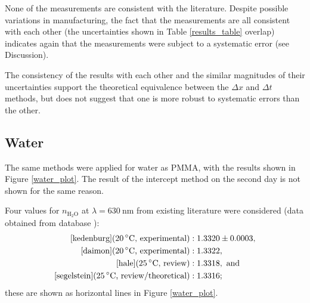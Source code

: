 \documentclass[
    aps,
    prl,
    reprint,
    10pt,
    amsmath,
    amssymb,
    a4paper,
    longbibliography
]{revtex4-2}
\begin{document}
None of the measurements are consistent with the literature. Despite
possible variations in manufacturing, the fact that the measurements are
all consistent with each other (the uncertainties shown in Table
\ref{results_table} overlap) indicates again that the measurements
were subject to a systematic error (see Discussion).

The consistency of the results with each other and the similar
magnitudes of their uncertainties support the theoretical
equivalence between the $\Delta x$ and $\Delta t$ methods, but does
not suggest that one is more robust to systematic errors than the other.


\subsection{Water}
The same methods were applied for water as PMMA, with the results shown
in Figure \ref{water_plot}. The result of the intercept method on the
second day is not shown for the same reason.

Four values for $n_\mathrm{H_2O}$ at $\lambda = \SI{630}{\nano\meter}$
from existing literature were considered (data obtained from database
\cite{rii}):
\begin{align*}
    \cite{kedenburg} (\SI{20}{\celsius} \text{, experimental})
    &: 1.3320 \pm 0.0003, \\
    \cite{daimon} (\SI{20}{\celsius} \text{, experimental})
    &: 1.3322, \\
    \cite{hale} (\SI{25}{\celsius} \text{, review})
    &: 1.3318, \text{ and} \\
    \cite{segelstein} (\SI{25}{\celsius} \text{, review/theoretical})
    &: 1.3316;
\end{align*}
these are shown as horizontal lines in Figure \ref{water_plot}.
\end{document}
